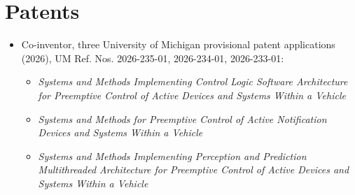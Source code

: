 \documentclass[11pt,a4paper,sans]{moderncv}
\begin{document}

\section{Patents}
\vspace{1pt}
\begin{itemize}
\item{Co-inventor, three University of Michigan provisional patent applications (2026), UM Ref. Nos. 2026-235-01, 2026-234-01, 2026-233-01:
\begin{itemize}
    \item \textit{Systems and Methods Implementing Control Logic Software Architecture for Preemptive Control of Active Devices and Systems Within a Vehicle}
    \item \textit{Systems and Methods for Preemptive Control of Active Notification Devices and Systems Within a Vehicle}
    \item \textit{Systems and Methods Implementing Perception and Prediction Multithreaded Architecture for Preemptive Control of Active Devices and Systems Within a Vehicle}
\end{itemize}}
\end{itemize}
\end{document}
